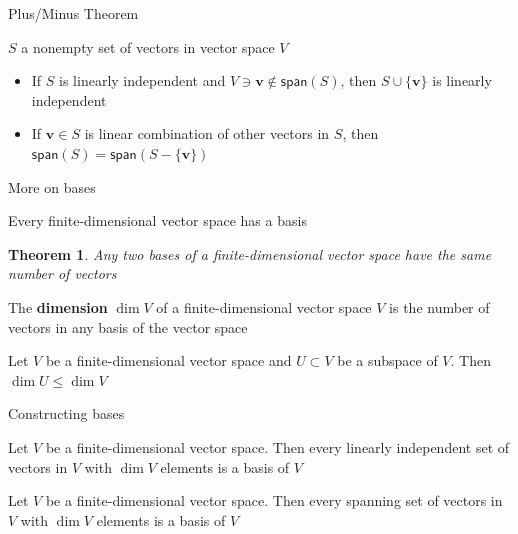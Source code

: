 \documentclass{beamer}
\def\bv{\mathbf{v}}
\renewcommand{\span}{\ensuremath{\mathsf{span}}}
\newtheorem{importanttheorem}[theorem]{Theorem}
\begin{document}
\begin{frame}{Plus/Minus Theorem}
	\begin{theorem}
		$S$ a nonempty set of vectors in vector space $V$
		\begin{itemize}
			\item If $S$ is linearly independent and $V\ni\bv\not\in \span(S)$, then $S\cup\{\bv\}$ is linearly independent
			\item If $\bv\in S$ is linear combination of other vectors in $S$, then $\span(S)=\span(S-\{\bv\})$
		\end{itemize}
	\end{theorem}
\end{frame}


\begin{frame}{More on bases}
	\begin{theorem}
	Every finite-dimensional vector space has a basis
	\end{theorem}
	\vfill
	\begin{importanttheorem}
		Any two bases of a finite-dimensional vector space have the same number of vectors
	\end{importanttheorem}
	\vfill
	\begin{definition}[Dimension]
		The \textbf{dimension} $\dim V$ of a finite-dimensional vector space $V$ is the number of vectors in any basis of the vector space
	\end{definition}
	\vfill
	\begin{theorem}
		Let $V$ be a finite-dimensional vector space and $U\subset V$ be a subspace of $V$. Then $\dim U\leq \dim V$
	\end{theorem}
\end{frame}


\begin{frame}{Constructing bases}
	\begin{theorem}
		Let $V$ be a finite-dimensional vector space. Then every linearly independent set of vectors in $V$ with $\dim V$ elements is a basis of $V$
	\end{theorem}
	\vfill
	\begin{theorem}
		Let $V$ be a finite-dimensional vector space. Then every spanning set of vectors in $V$ with $\dim V$ elements is a basis of $V$
	\end{theorem}
\end{frame}



\end{document}

